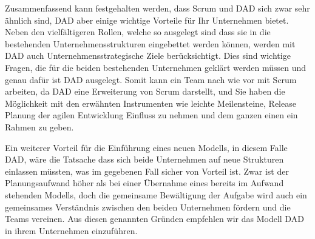 Zusammenfassend kann festgehalten werden, dass Scrum und DAD sich zwar sehr ähnlich sind, DAD aber einige wichtige Vorteile für Ihr Unternehmen bietet. Neben den vielfältigeren Rollen, welche so ausgelegt sind dass sie in die bestehenden Unternehmensstrukturen eingebettet werden können, werden mit DAD auch Unternehmensstrategische Ziele berücksichtigt. Dies sind wichtige Fragen, die für die beiden bestehenden Unternehmen geklärt werden müssen und genau dafür ist DAD ausgelegt. Somit kann ein Team nach wie vor mit Scrum arbeiten, da DAD eine Erweiterung von Scrum darstellt,  und Sie haben die Möglichkeit mit den erwähnten Instrumenten wie leichte Meilensteine, Release Planung der agilen Entwicklung Einfluss zu nehmen und dem ganzen einen ein Rahmen zu geben.\newline

Ein weiterer Vorteil für die Einführung eines neuen Modells, in diesem Falle DAD, wäre die Tatsache dass sich beide Unternehmen auf neue Strukturen einlassen müssten, was im gegebenen Fall sicher von Vorteil ist. Zwar ist der Planungsaufwand höher als bei einer Übernahme eines bereits im Aufwand stehenden Modells, doch die gemeinsame Bewältigung der Aufgabe wird auch ein gemeinsames Verständnis zwischen den beiden Unternehmen fördern und die Teams vereinen. Aus diesen genannten Gründen empfehlen wir das Modell DAD in ihrem Unternehmen einzuführen.





	